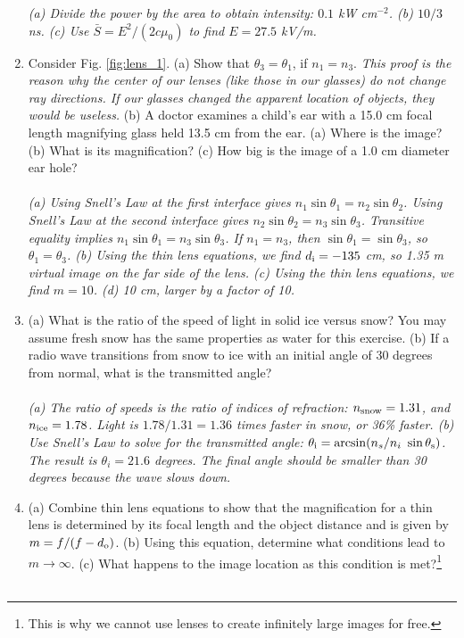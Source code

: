\documentclass[12pt,twocolumn]{article}
\begin{document}
\begin{enumerate}
\textit{(a) Divide the power by the area to obtain intensity: $0.1$ kW cm$^{-2}$. (b) $10/3$ ns. (c) Use $\bar{S} = E^2/(2c\mu_0)$ to find $E = 27.5$ kV/m.}
\item Consider Fig. \ref{fig:lens_1}.  (a) Show that $\theta_3 = \theta_1$, if $n_1 = n_3$.  \textit{This proof is the reason why the center of our lenses (like those in our glasses) do not change ray directions.  If our glasses changed the apparent location of objects, they would be useless.} (b) A doctor examines a child's ear with a 15.0 cm focal length magnifying glass held 13.5 cm from the ear. (a) Where is the image? (b) What is its magnification? (c) How big is the image of a 1.0 cm diameter ear hole? \\ \\
\textit{(a) Using Snell's Law at the first interface gives $n_1 \sin\theta_1 = n_2\sin\theta_2$.  Using Snell's Law at the second interface gives $n_2\sin\theta_2 = n_3\sin\theta_3$.  Transitive equality implies $n_1\sin\theta_1 = n_3\sin\theta_3$.  If $n_1 = n_3$, then $\sin\theta_1 = \sin\theta_3$, so $\theta_1 = \theta_3$. (b) Using the thin lens equations, we find $d_{\rm i} = -135$ cm, so 1.35 m virtual image on the far side of the lens. (c) Using the thin lens equations, we find $m = 10$. (d) 10 cm, larger by a factor of 10.}
\item (a) What is the ratio of the speed of light in solid ice versus snow?  You may assume fresh snow has the same properties as water for this exercise. (b) If a radio wave transitions from snow to ice with an initial angle of 30 degrees from normal, what is the transmitted angle? \\ \\
\textit{(a) The ratio of speeds is the ratio of indices of refraction: $n_{\rm snow} = 1.31$, and $n_{\rm ice} = 1.78$.  Light is $1.78/1.31 = 1.36$ times faster in snow, or 36\% faster. (b) Use Snell's Law to solve for the transmitted angle: $\theta_{\rm i} = \arcsin(n_s/n_i~\sin\theta_{\rm s})$.  The result is $\theta_i = 21.6$ degrees. The final angle should be smaller than 30 degrees because the wave slows down.}
\item (a) Combine thin lens equations to show that the magnification for a thin lens is determined by its focal length and the object distance and is given by $m=f/(f - d_{\rm o})$. (b) Using this equation, determine what conditions lead to $m \to \infty$. (c) What happens to the image location as this condition is met?\footnote{This is why we cannot use lenses to create infinitely large images for free.} \\ \\

\end{enumerate}
\end{document}
